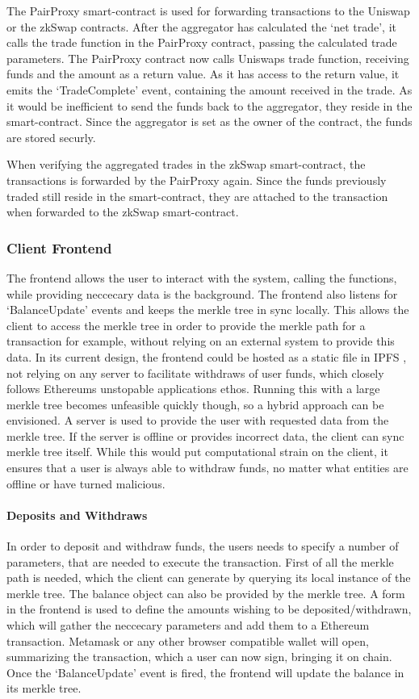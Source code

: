 \documentclass[../../thesis.tex]{subfiles}
\begin{document}
The PairProxy smart-contract is used for forwarding transactions to the Uniswap or the zkSwap contracts. After the aggregator has calculated the `net trade', it calls the trade function in the PairProxy contract, passing the calculated trade parameters. The PairProxy contract now calls Uniswaps trade function, receiving funds and the amount as a return value. As it has access to the return value, it emits the `TradeComplete' event, containing the amount received in the trade. As it would be inefficient to send the funds back to the aggregator, they reside in the smart-contract. Since the aggregator is set as the owner of the contract, the funds are stored securly.

When verifying the aggregated trades in the zkSwap smart-contract, the transactions is forwarded by the PairProxy again. Since the funds previously traded still reside in the smart-contract, they are attached to the transaction when forwarded to the zkSwap smart-contract.

\subsubsection{Client Frontend}
The frontend allows the user to interact with the system, calling the functions, while providing neccecary data is the background. The frontend also listens for `BalanceUpdate' events and keeps the merkle tree in sync locally. This allows the client to access the merkle tree in order to provide the merkle path for a transaction for example, without relying on an external system to provide this data. In its current design, the frontend could be hosted as a static file in IPFS \cite{benet2014ipfs}, not relying on any server to facilitate withdraws of user funds, which closely follows Ethereums unstopable applications ethos. Running this with a large merkle tree becomes unfeasible quickly though, so a hybrid approach can be envisioned. A server is used to provide the user with requested data from the merkle tree. If the server is offline or provides incorrect data, the client can sync merkle tree itself. While this would put computational strain on the client, it ensures that a user is always able to withdraw funds, no matter what entities are offline or have turned malicious. 

\paragraph{Deposits and Withdraws}
In order to deposit and withdraw funds, the users needs to specify a number of parameters, that are needed to execute the transaction. First of all the merkle path is needed, which the client can generate by querying its local instance of the merkle tree. The balance object can also be provided by the merkle tree. A form in the frontend is used to define the amounts wishing to be deposited/withdrawn, which will gather the neccecary parameters and add them to a Ethereum transaction. Metamask or any other browser compatible wallet will open, summarizing the transaction, which a user can now sign, bringing it on chain. Once the `BalanceUpdate' event is fired, the frontend will update the balance in its merkle tree.
\end{document}
